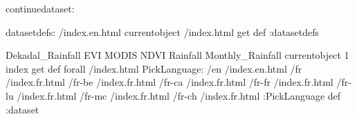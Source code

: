 \begin{ingrid}
continuedataset:

datasetdefs:
/index.en.html currentobject /index.html get def
:datasetdefs

{ Dekadal_Rainfall EVI MODIS NDVI Rainfall Monthly_Rainfall } { currentobject 1 index get def } forall
/index.html {
PickLanguage:
/en /index.en.html
/fr /index.fr.html
/fr-be /index.fr.html
/fr-ca /index.fr.html
/fr-fr /index.fr.html
/fr-lu /index.fr.html
/fr-mc /index.fr.html
/fr-ch /index.fr.html
:PickLanguage
} def
:dataset
\end{ingrid}
